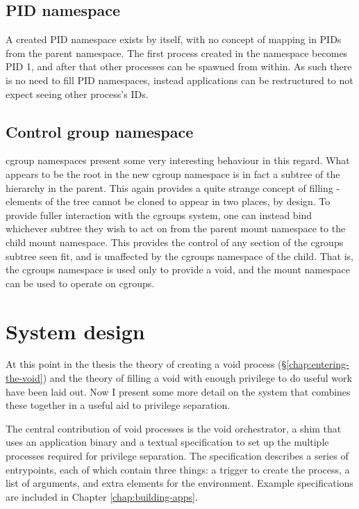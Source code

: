 \documentclass[12pt,a4paper,twoside]{report}
\begin{document}
\subsection{PID namespace}
\label{sec:filling-pid}

A created PID namespace exists by itself, with no concept of mapping in PIDs from the parent namespace. The first process created in the namespace becomes PID 1, and after that other processes can be spawned from within. As such there is no need to fill PID namespaces, instead applications can be restructured to not expect seeing other process's IDs.

\subsection{Control group namespace}
\label{sec:filling-cgroup}

cgroup namespaces present some very interesting behaviour in this regard. What appears to be the root in the new cgroup namespace is in fact a subtree of the hierarchy in the parent. This again provides a quite strange concept of filling - elements of the tree cannot be cloned to appear in two places, by design. To provide fuller interaction with the cgroups system, one can instead bind whichever subtree they wish to act on from the parent mount namespace to the child mount namespace. This provides the control of any section of the cgroups subtree seen fit, and is unaffected by the cgroups namespace of the child. That is, the cgroups namespace is used only to provide a void, and the mount namespace can be used to operate on cgroups.

\section{System design}
\label{sec:system-design}

At this point in the thesis the theory of creating a void process (§\ref{chap:entering-the-void}) and the theory of filling a void with enough privilege to do useful work have been laid out. Now I present some more detail on the system that combines these together in a useful aid to privilege separation.

The central contribution of void processes is the void orchestrator, a shim that uses an application binary and a textual specification to set up the multiple processes required for privilege separation. The specification describes a series of entrypoints, each of which contain three things: a trigger to create the process, a list of arguments, and extra elements for the environment. Example specifications are included in Chapter \ref{chap:building-apps}.
\end{document}
